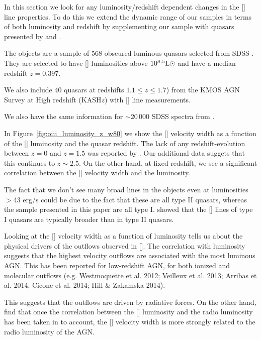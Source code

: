 In this section we look for any luminosity/redshift dependent changes in the [] line properties. 
To do this we extend the dynamic range of our samples in terms of both luminosity and redshift by supplementing our sample with quasars presented by \citet{zakamska14} and \citet{harrison16}. 

The \citet{zakamska14} objects are a sample of 568 obscured luminous quasars selected from SDSS \citep{reyes08,yuan16}. 
They are selected to have [] luminosities above $10^{8.5}{\rm L}\odot$ and have a median redshift $z=0.397$. 

We also include 40 quasars at redshifts $1.1 \leq z \leq 1.7$) from the KMOS AGN Survey at High redshift (KASH$z$) with [] line measurements. 

We also have the same information for $\sim$20\,000 SDSS spectra from \citet{mullaney13}. 

In Figure~\ref{fig:oiii_luminosity_z_w80} we show the [] velocity width as a function of the [] luminosity and the quasar redshift. 
The lack of any redshift-evolution between $z=0$ and $z=1.5$ was reported by \citet{harrison16}.
Our additional data suggets that this continues to $z\sim2.5$. 
On the other hand, at fixed redshift, we see a significant correlation between the [] velocity width and the luminosity. 

The fact that we don't see many broad lines in the \citet{zakamska14} objects even at luminosities $>$43 erg/s could be due to the fact that these are all type II quasars, whereas the sample presented in this paper are all type I. 
\citet{mullaney13} showed that the [] lines of type I quasars are typically broader than in type II quasars. 

Looking at the [] velocity width as a function of luminosity tells us about the physical drivers of the outflows observed in []. 
The correlation with luminosity suggests that the highest velocity outflows are associated with the most luminous AGN. 
This has been reported for low-redshift AGN, for both ionized and molecular outflows (e.g. Westmoquette et al. 2012; Veilleux et al. 2013; Arribas et al. 2014; Cicone et al. 2014; Hill \& Zakamska 2014).

This suggests that the outflows are driven by radiative forces. 
On the other hand, \citet{mullaney13} find that once the correlation between the [] luminosity and the radio luminosity has been taken in to account, the [] velocity width is more strongly related to the radio luminosity of the AGN. 

